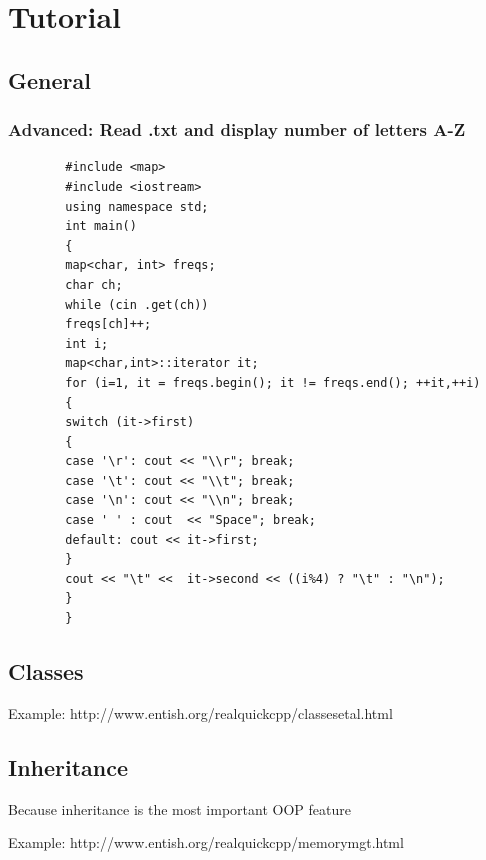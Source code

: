 \documentclass[compress]{beamer}
\newlength\someheight
\begin{document}
\section{Tutorial}

\subsection{General}

\begin{frame}[fragile]
	\frametitle{Advanced: Read .txt and display number of letters A-Z}
	\begin{adjustbox}{width=\textwidth,height=\someheight,keepaspectratio}
		\begin{lstlisting}
		#include <map>
		#include <iostream>
		using namespace std;
		int main() 
		{
		map<char, int> freqs;
		char ch;
		while (cin .get(ch))
		freqs[ch]++;
		int i;
		map<char,int>::iterator it;
		for (i=1, it = freqs.begin(); it != freqs.end(); ++it,++i) 
		{
		switch (it->first) 
		{
		case '\r': cout << "\\r"; break;
		case '\t': cout << "\\t"; break;
		case '\n': cout << "\\n"; break;
		case ' ' : cout  << "Space"; break;
		default: cout << it->first; 
		}
		cout << "\t" <<  it->second << ((i%4) ? "\t" : "\n"); 
		}
		}
		\end{lstlisting}
	\end{adjustbox}
\end{frame}

\subsection{Classes}

Example:
http://www.entish.org/realquickcpp/classesetal.html

\subsection{Inheritance}

Because inheritance is the most important OOP feature

Example:
http://www.entish.org/realquickcpp/memorymgt.html
\end{document}

